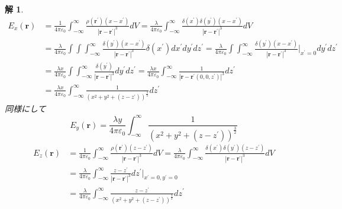 \documentclass{jsarticle}
\newtheorem{ans}{解}[section]
\begin{document}
\begin{ans}~\\
\begin{align*}
E_{x}(\bm{r})&=\frac{1}{4\pi\varepsilon_{0}}\int_{-\infty}^{\infty}\frac{\rho(\bm{r}^{\prime})(x-x^{\prime})}{\left|\bm{r}-\bm{r}^{\prime}\right|^{3}}dV=\frac{\lambda}{4\pi\varepsilon_{0}}\int_{-\infty}^{\infty}\frac{\delta(x^{\prime})\delta(y^{\prime})(x-x^{\prime})}{\left|\bm{r}-\bm{r}^{\prime}\right|^{3}}dV\\
&=\frac{\lambda}{4\pi\varepsilon_{0}}\int\int\int_{-\infty}^{\infty}\frac{\delta(y^{\prime})(x-x^{\prime})}{\left|\bm{r}-\bm{r}^{\prime}\right|^{3}}\delta(x^{\prime})dx^{\prime}dy^{\prime}dz^{\prime}=\frac{\lambda}{4\pi\varepsilon_{0}}\int\int_{-\infty}^{\infty}\frac{\delta(y^{\prime})(x-x^{\prime})}{\left|\bm{r}-\bm{r}^{\prime}\right|^{3}}\Bigg|_{x^{\prime}=0}dy^{\prime}dz^{\prime}\\
&=\frac{\lambda x}{4\pi\varepsilon_{0}}\int\int_{-\infty}^{\infty}\frac{\delta(y^{\prime})}{\left|\bm{r}-\bm{r}^{\prime}\right|^{3}}dy^{\prime}dz^{\prime}=\frac{\lambda x}{4\pi\varepsilon_{0}}\int_{-\infty}^{\infty}\frac{1}{\left|\bm{r}-\bm{r}^{\prime}(0,0,z^{\prime})\right|^{3}}dz^{\prime}\\
&=\frac{\lambda x}{4\pi\varepsilon_{0}}\int_{-\infty}^{\infty}\frac{1}{\left(x^{2}+y^{2}+(z-z^{\prime})\right)^{\frac{3}{2}}}dz^{\prime}
\end{align*}
同様にして
\[E_{y}(\bm{r})=\frac{\lambda y}{4\pi\varepsilon_{0}}\int_{-\infty}^{\infty}\frac{1}{\left(x^{2}+y^{2}+(z-z^{\prime})\right)^{\frac{3}{2}}}\]
\begin{align*}
E_{z}(\bm{r})&=\frac{1}{4\pi\varepsilon_{0}}\int_{-\infty}^{\infty}\frac{\rho(\bm{r}^{\prime})(z-z^{\prime})}{\left|\bm{r}-\bm{r}^{\prime}\right|^{3}}dV=\frac{\lambda}{4\pi\varepsilon_{0}}\int_{-\infty}^{\infty}\frac{\delta(x^{\prime})\delta(y^{\prime})(z-z^{\prime})}{\left|\bm{r}-\bm{r}^{\prime}\right|^{3}}dV\\
&=\frac{\lambda}{4\pi\varepsilon_{0}}\int_{-\infty}^{\infty}\frac{z-z^{\prime}}{\left|\bm{r}-\bm{r}^{\prime}\right|^{3}}dz^{\prime}\Bigg|_{x^{\prime}=0,y^{\prime}=0}\\
&=\frac{\lambda}{4\pi\varepsilon_{0}}\int_{-\infty}^{\infty}\frac{z-z^{\prime}}{\left(x^{2}+y^{2}+(z-z^{\prime})\right)^{\frac{3}{2}}}dz^{\prime}
\end{align*}
\end{ans}
\end{document}
